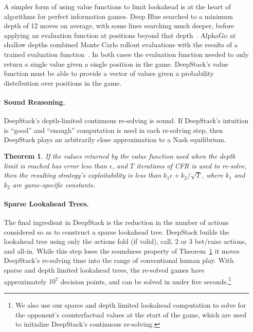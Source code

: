 \documentclass[12pt]{article}
\newtheorem{theorem}{Theorem}
\begin{document}
A simpler form of using value functions to limit lookahead is at the heart of algorithms for perfect information games.  Deep Blue searched to a minimum depth of 12 moves on average, with some lines searching much deeper, before applying an evaluation function at positions beyond that depth~\cite{CampbellEtAl02}.  AlphaGo at shallow depths combined Monte Carlo rollout evaluations with the results of a trained evaluation function~\cite{Silver16:AlphaGo}.  In both cases the evaluation function needed to only return a single value given a single position in the game.  DeepStack's value function must be able to provide a vector of values given a probability distribution over positions in the game.

\paragraph{Sound Reasoning.}
DeepStack's depth-limited continuous re-solving is sound.  If DeepStack's intuition is ``good'' and ``enough'' computation is used in each re-solving step, then DeepStack plays an arbitrarily close approximation to a Nash equilibrium.
%
\begin{theorem}
If the values returned by the value function used when the depth limit is reached has error less than $\epsilon$, and $T$ iterations of CFR is used to re-solve, then the resulting strategy's exploitability is less than $k_1\epsilon + k_2 / \sqrt{T}$, where $k_1$ and $k_2$ are game-specific constants.\cite{SOM}
\label{thm}
\end{theorem}

\paragraph{Sparse Lookahead Trees.} 
 
The final ingredient in DeepStack is the reduction in the number of actions considered so as to construct a sparse lookahead tree.
DeepStack builds the lookahead tree using only the actions fold (if valid), 
call, 2 or 3 bet/raise actions, and all-in.  
While this step loses the soundness property of Theorem~\ref{thm} it moves DeepStack's re-solving time into the range of conventional human play.  With sparse and depth limited
lookahead trees, the re-solved games have approximately $10^{7}$ decision points, and can be solved 
in under five seconds.\footnote{We also use our sparse and depth limited lookahead computation to solve for the opponent's counterfactual values at the start of the game, which are used to initialize DeepStack's continuous re-solving.\label{footnote:start-values}}
\end{document}
